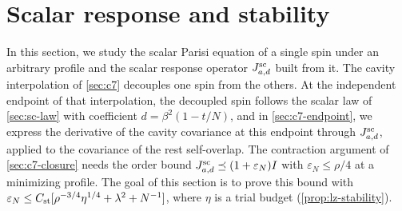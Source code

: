 \chapter{Scalar response and stability}\label{sec:sc}\label{sec:scalar-stability}

In this section, we study the scalar Parisi equation of a single spin
under an arbitrary profile and the scalar response operator
$J^{\mathrm{sc}}_{a,d}$ built from it. The cavity interpolation of
\cref{sec:c7} decouples one spin from the others. At the independent
endpoint of that interpolation, the decoupled spin follows the scalar
law of \cref{sec:sc-law} with coefficient $d=\beta^2(1-t/N)$, and in
\cref{sec:c7-endpoint}, we express the derivative of the cavity covariance
at this endpoint through $J^{\mathrm{sc}}_{a,d}$, applied to the
covariance of the rest self-overlap. The contraction argument of
\cref{sec:c7-closure} needs the order bound
$J^{\mathrm{sc}}_{a,d}\preceq(1+\varepsilon_N)I$ with
$\varepsilon_N\le\rho/4$ at a minimizing profile. The goal of this
section is to prove this bound with
$\varepsilon_N\le C_{\rm st}[\rho^{-3/4}\eta^{1/4}+\lambda^2+N^{-1}]$,
where $\eta$ is a trial budget (\cref{prop:lz-stability}).


